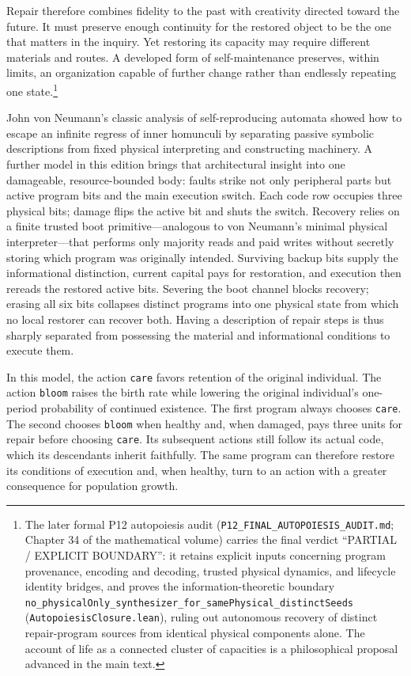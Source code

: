 \documentclass[
  english,
  11pt,
  oneside]{book}
\begin{document}
Repair therefore combines fidelity to the past with creativity directed toward the future. It must preserve enough continuity for the restored object to be the one that matters in the inquiry. Yet restoring its capacity may require different materials and routes. A developed form of self-maintenance preserves, within limits, an organization capable of further change rather than endlessly repeating one state.\footnote{\hypertarget{ph-note-18}{}The later formal P12 autopoiesis audit (\nolinkurl{P12_FINAL_AUTOPOIESIS_AUDIT.md}; Chapter 34 of the mathematical volume) carries the final verdict ``PARTIAL / EXPLICIT BOUNDARY'': it retains explicit inputs concerning program provenance, encoding and decoding, trusted physical dynamics, and lifecycle identity bridges, and proves the information-theoretic boundary \nolinkurl{no_physicalOnly_synthesizer_for_samePhysical_distinctSeeds} (\texttt{AutopoiesisClosure.lean}), ruling out autonomous recovery of distinct repair-program sources from identical physical components alone. The account of life as a connected cluster of capacities is a philosophical proposal advanced in the main text.}

John von Neumann's classic analysis of self-reproducing automata showed how to escape an infinite regress of inner homunculi by separating passive symbolic descriptions from fixed physical interpreting and constructing machinery. A further model in this edition brings that architectural insight into one damageable, resource-bounded body: faults strike not only peripheral parts but active program bits and the main execution switch. Each code row occupies three physical bits; damage flips the active bit and shuts the switch. Recovery relies on a finite trusted boot primitive---analogous to von Neumann's minimal physical interpreter---that performs only majority reads and paid writes without secretly storing which program was originally intended. Surviving backup bits supply the informational distinction, current capital pays for restoration, and execution then rereads the restored active bits. Severing the boot channel blocks recovery; erasing all six bits collapses distinct programs into one physical state from which no local restorer can recover both. Having a description of repair steps is thus sharply separated from possessing the material and informational conditions to execute them.

In this model, the action \texttt{care} favors retention of the original individual. The action \texttt{bloom} raises the birth rate while lowering the original individual's one-period probability of continued existence. The first program always chooses \texttt{care}. The second chooses \texttt{bloom} when healthy and, when damaged, pays three units for repair before choosing \texttt{care}. Its subsequent actions still follow its actual code, which its descendants inherit faithfully. The same program can therefore restore its conditions of execution and, when healthy, turn to an action with a greater consequence for population growth.
\end{document}
